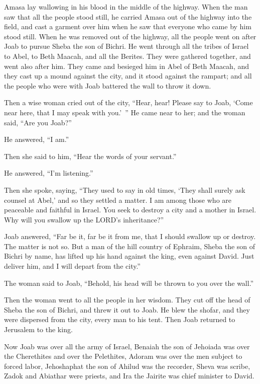\myverse{}Amasa lay wallowing in his blood in the middle of the highway.
When the man saw that all the people stood still, he carried Amasa out of the highway into the field,
and cast a garment over him when he saw that everyone who came by him stood still.
\myverse{}When he was removed out of the highway, all the people went on after Joab
to pursue Sheba the son of Bichri.
\myverse{}He went through all the tribes of Israel to Abel, to Beth Maacah, and all
the Berites. They were gathered together, and went also after him.
\myverse{}They came and besieged him in Abel of Beth Maacah, and they cast up a mound
against the city, and it stood against the rampart; and all the people who were with Joab battered the
wall to throw it down.

\myverse{}Then a wise woman cried out of the city, “Hear, hear! Please
say to Joab, ‘Come near here, that I may speak with you.’ ”
\myverse{}He came near to her; and the woman said, “Are you Joab?”

He answered, “I am.”

Then she said to him, “Hear the words of your servant.”

He answered, “I’m listening.”

\myverse{}Then she spoke, saying, “They used to say in old times, ‘They
shall surely ask counsel at Abel,’ and so they settled a matter.
\myverse{}I am among those who are peaceable and faithful in Israel. You seek to destroy
a city and a mother in Israel. Why will you swallow up the LORD’s inheritance?”

\myverse{}Joab answered, “Far be it, far be it from me, that I should
swallow up or destroy.
\myverse{}The matter is not so. But a man of the hill country of Ephraim, Sheba the
son of Bichri by name, has lifted up his hand against the king, even against David. Just deliver him,
and I will depart from the city.”

The woman said to Joab, “Behold, his head will be thrown to you over the wall.”

\myverse{}Then the woman went to all the people in her wisdom. They cut
off the head of Sheba the son of Bichri, and threw it out to Joab. He blew the shofar, and they were dispersed
from the city, every man to his tent. Then Joab returned to Jerusalem to the king.

\myverse{}Now Joab was over all the army of Israel, Benaiah the son of
Jehoiada was over the Cherethites and over the Pelethites,
\myverse{}Adoram was over the men subject to forced labor, Jehoshaphat the son of Ahilud
was the recorder,
\myverse{}Sheva was scribe, Zadok and Abiathar were priests,
\myverse{}and Ira the Jairite was chief minister to David.


